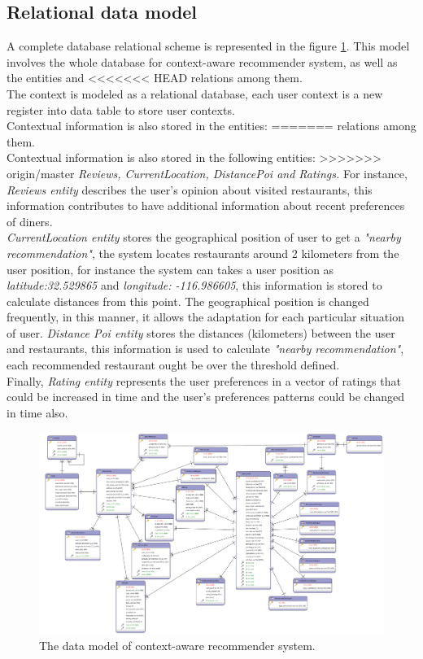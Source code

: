 \subsection{Relational data model} 

A complete database relational scheme is represented in the figure
\ref{fig:datamodel}. This model involves the whole database for
context-aware recommender system, as well as the entities and
<<<<<<< HEAD
relations among them. \\The context is modeled as a relational
database, each user context is a new register into data table to store
user contexts.\\Contextual information is also stored in the entities:
=======
relations among them. \\Contextual information is also stored in the following
entities:
>>>>>>> origin/master
\textit{Reviews, CurrentLocation, DistancePoi and Ratings.} For
instance, \textit{Reviews entity} describes the user’s opinion about
visited restaurants, this information contributes to have additional
information about recent preferences of diners.\\
\textit{CurrentLocation entity} stores the geographical position of
user to get a \textit{"nearby recommendation"}, the system locates
restaurants around 2 kilometers from the user position, for instance
the system can takes a user position as \textit{latitude:32.529865}
and \textit{longitude: -116.986605}, this information is stored to
calculate distances from this point. The geographical position is
changed frequently, in this manner, it allows the adaptation for each
particular situation of user. \textit{Distance Poi entity} stores the
distances (kilometers) between the user and restaurants, this
information is used to calculate \textit{"nearby recommendation"},
each recommended restaurant ought be over the threshold defined.\\
Finally, \textit{Rating entity} represents the user preferences  
in a vector of ratings that could be increased in time and  
the user's preferences patterns could be changed in time also.
\begin{landscape} 
\begin{figure}[!h] 
\captionsetup{font=footnotesize}
\centering
\includegraphics[width=1.3\textwidth]{img/recomet.png}
\caption{The data model of context-aware recommender system.}
\label{fig:datamodel}    
\end{figure}
\end{landscape}

